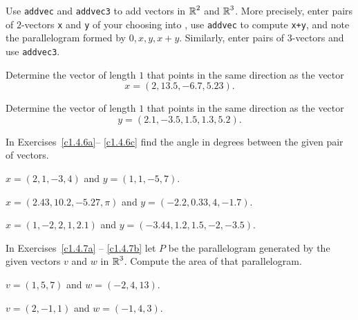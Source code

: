 \documentclass{ximera}
\begin{document}
\CEXER

\begin{exercise} \label{c1.4.4}
Use {\tt addvec} and {\tt addvec3} to add vectors in $\mbox{$\Bbb{R}$}^2$ and
$\mbox{$\Bbb{R}$}^3$.  More precisely, enter pairs of $2$-vectors {\tt x} and {\tt y} 
of your choosing into \Matlabp, use {\tt addvec} to compute {\tt x+y},
and note the parallelogram formed by $0,x,y,x+y$.  Similarly, enter 
pairs of $3$-vectors and use {\tt addvec3}.
\end{exercise}

\begin{exercise} \label{c1.4.5}
Determine the vector of length $1$ that points in the same direction
as the vector
\[
x=(2,13.5,-6.7,5.23).
\]
\end{exercise}

\begin{exercise} \label{c1.4.5b}
Determine the vector of length $1$ that points in the same direction
as the vector
\[
y=(2.1,-3.5,1.5,1.3,5.2).
\]
\end{exercise}

\noindent In Exercises~\ref{c1.4.6a}-- \ref{c1.4.6c} find the angle in
degrees between the given pair of vectors.
\begin{exercise} \label{c1.4.6a}
$x=(2,1,-3,4)$ and $y=(1,1,-5,7)$.
\end{exercise}
\begin{exercise} \label{c1.4.6b}
$x=(2.43, 10.2,-5.27,\pi)$ and $y= (-2.2,0.33,4,-1.7)$.
\end{exercise}
\begin{exercise} \label{c1.4.6c}
$x=(1,-2,2,1,2.1)$ and $y=(-3.44,1.2,1.5,-2,-3.5)$.
\end{exercise}

\noindent In Exercises~\ref{c1.4.7a} -- \ref{c1.4.7b} let $P$ be the 
parallelogram generated by the given vectors $v$ and $w$ in $\mbox{$\Bbb{R}$}^3$.  
Compute the area of that parallelogram.
\begin{exercise} \label{c1.4.7a}
$v=(1,5,7)$ and $w=(-2,4,13)$.
\end{exercise}
\begin{exercise} \label{c1.4.7b}
$v=(2,-1,1)$ and $w=(-1,4,3)$.
\end{exercise}
\end{document}
